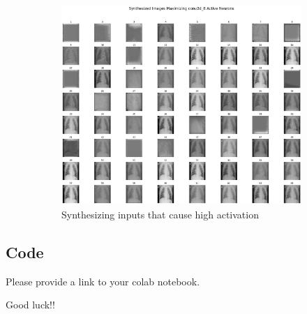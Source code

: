 \documentclass{article}
\begin{document}
\begin{figure}
\begin{subfigure}[b]{0.45\textwidth}
         \includegraphics[width=1.1\linewidth, angle=0]{synth_images.png}
          \caption{Synthesizing inputs that cause high activation}
          \label{fig:synth_images}
     \end{subfigure}
     
        \caption{}
        \label{fig:three Explainability approaches}
\end{figure}


\subsection{Code}

Please provide a link to your colab notebook.

Good luck!!


\end{document}
